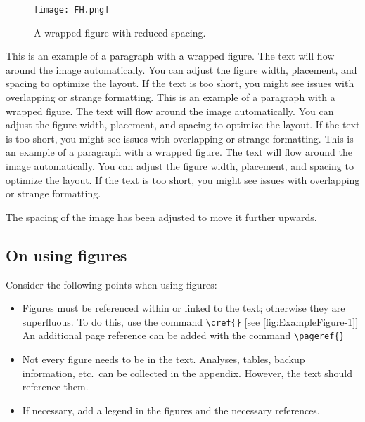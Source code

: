 

\begin{wrapfigure}{r}{0.4\textwidth}  %
    \vspace{-10pt}  %
    \centering
    \texttt{[image: FH.png]}
    \caption{A wrapped figure with reduced spacing.}
    \label{fig:wrapfig}
\end{wrapfigure}



This is an example of a paragraph with a wrapped figure. The text will flow around the image automatically. You can adjust the figure width, placement, and spacing to optimize the layout. If the text is too short, you might see issues with overlapping or strange formatting.
This is an example of a paragraph with a wrapped figure. The text will flow around the image automatically. You can adjust the figure width, placement, and spacing to optimize the layout. If the text is too short, you might see issues with overlapping or strange formatting.
This is an example of a paragraph with a wrapped figure. The text will flow around the image automatically. You can adjust the figure width, placement, and spacing to optimize the layout. If the text is too short, you might see issues with overlapping or strange formatting.

The spacing of the image has been adjusted to move it further upwards.

\subsection{On using figures}
Consider the following points when using figures:
\begin{itemize}
    \item Figures must be referenced within or linked to the text; otherwise they are superfluous. To do this, use the command \verb|\cref{}|
    [see \cref{fig:ExampleFigure-1}]\\
    An additional page reference can be added with the command \verb|\pageref{}| 
    \item Not every figure needs to be in the text. Analyses, tables, backup information, etc.~can be collected in the appendix. However, the text should reference them.
    \item If necessary, add a legend in the figures and the necessary references.
\end{itemize}
